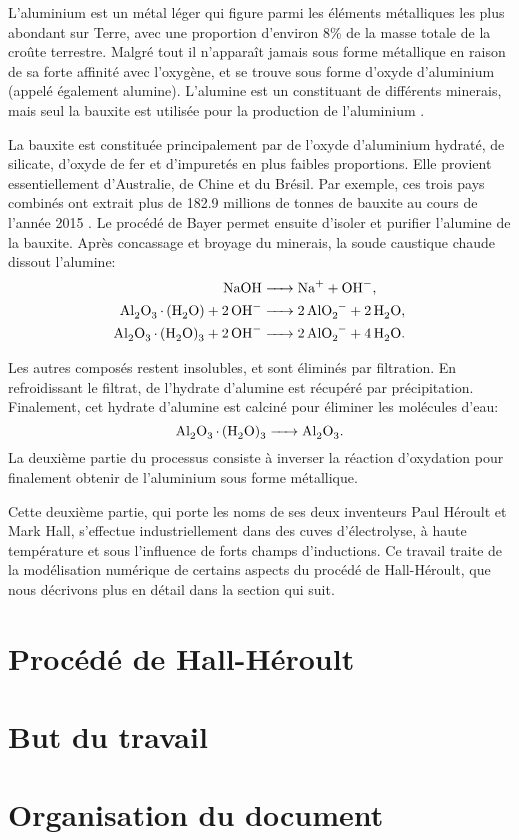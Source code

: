 L'aluminium est un métal léger qui figure parmi les éléments
métalliques les plus abondant sur Terre, avec une proportion d'environ
\num{8}\% de la masse totale de la croûte terrestre. Malgré tout il
n'apparaît jamais sous forme métallique en raison de sa forte affinité
avec l'oxygène, et se trouve sous forme d'oxyde d'aluminium 
(appelé également alumine). L'alumine est un constituant de différents
minerais, mais seul la bauxite est utilisée pour la production de
l'aluminium \cite{Hydro2018}.

La bauxite est constituée principalement par de l'oxyde d'aluminium
hydraté, de silicate, d'oxyde de fer et d'impuretés en plus faibles
proportions. Elle provient essentiellement d'Australie, de Chine et du
Brésil. Par exemple, ces trois pays combinés ont extrait plus de
\num{182.9} millions de tonnes de bauxite au cours de l'année \num{2015}
\cite{USGS2015}. Le procédé de Bayer permet ensuite d'isoler et
purifier l'alumine de la bauxite. Après concassage et broyage du
minerais, la soude caustique chaude dissout l'alumine:
\begin{align*}
  \cee{NaOH &-> Na+ + OH-},\\
  \cee{Al2O3.(H2O) + 2OH- &-> 2AlO2- + 2H2O},\\
  \cee{Al2O3.(H2O)3 + 2OH- &-> 2AlO2- + 4H2O}.
\end{align*}

Les autres composés restent insolubles, et sont éliminés par
filtration. En refroidissant le filtrat, de l'hydrate d'alumine est
récupéré par précipitation. Finalement, cet hydrate d'alumine est
calciné pour éliminer les molécules d'eau:
\begin{equation*}
  \cee{Al2O3.(H2O)3 -> Al2O3}.
\end{equation*}
La deuxième partie du processus consiste à inverser la réaction
d'oxydation pour finalement obtenir de l'aluminium sous forme
métallique.

Cette deuxième partie, qui porte les noms de ses deux inventeurs Paul
Héroult et Mark Hall, s'effectue industriellement dans des cuves
d'électrolyse, à haute température et sous l'influence de forts champs
d'inductions. Ce travail traite de la modélisation numérique de certains
aspects du procédé de Hall-Héroult, que nous décrivons plus en détail
dans la section qui suit.


\section{Procédé de Hall-Héroult}
\label{sec:introduction-hall-heroult}



\section{But du travail}
\label{sec:introduction-aims}



\section{Organisation du document}
\label{sec:introduction-organisation}

